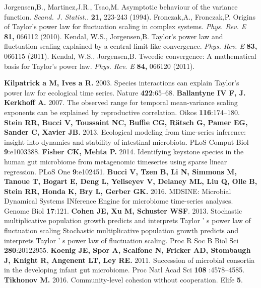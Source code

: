 \documentclass[12pt,oneside,letterpaper]{article}
\begin{document}
\begin{thebibliography}{99}
 Jorgensen,B., Martinez,J.R., Tsao,M. Asymptotic behaviour of the variance function. {\it Scand. J. Statist..} {\bf 21,} 223-243 (1994).
 Fronczak,A., Fronczak,P. Origins of Taylor's power law for fluctuation scaling in complex systems. {\it Phys. Rev. E} {\bf 81,} 066112 (2010).
 Kendal, W.S., Jorgensen,B. Taylor's power law and fluctuation scaling explained by a central-limit-like convergence. {\it Phys. Rev. E} {\bf 83,} 066115 (2011).
 Kendal, W.S., Jorgensen,B. Tweedie convergence: A mathematical basis for Taylor's power law. {\it Phys. Rev. E} {\bf 84,} 066120 (2011).

 {\bf Kilpatrick a M, Ives a R.} 2003. Species interactions can explain Taylor’s power law for ecological time series. Nature {\bf 422}:65–68.
 {\bf Ballantyne IV F, J. Kerkhoff A.} 2007. The observed range for temporal mean-variance scaling exponents can be explained by reproductive correlation. Oikos {\bf 116}:174–180.
 {\bf Stein RR, Bucci V, Toussaint NC, Buffie CG, Rätsch G, Pamer EG, Sander C, Xavier JB.}  2013. Ecological modeling from time-series inference: insight into dynamics and stability of intestinal microbiota. PLoS Comput Biol {\bf 9}:e1003388.
 {\bf Fisher CK, Mehta P.} 2014. Identifying keystone species in the human gut microbiome from metagenomic timeseries using sparse linear regression. PLoS One {\bf 9}:e102451.
  {\bf Bucci V, Tzen B, Li N, Simmons M, Tanoue T, Bogart E, Deng L, Yeliseyev V, Delaney ML, Liu Q, Olle B, Stein RR, Honda K, Bry L, Gerber GK.} 2016. MDSINE: Microbial Dynamical Systems INference Engine for microbiome time-series analyses. Genome Biol {\bf 17}:121.
 {\bf Cohen JE, Xu M, Schuster WSF}. 2013. Stochastic multiplicative population growth predicts and interprets Taylor ’ s power law of fluctuation scaling Stochastic multiplicative population growth predicts and interprets Taylor ’ s power law of fluctuation scaling. Proc R Soc B Biol Sci {\bf 280}:20122955.
 {\bf Koenig JE, Spor A, Scalfone N, Fricker AD, Stombaugh J, Knight R, Angenent LT, Ley RE.} 2011. Succession of microbial consortia in the developing infant gut microbiome. Proc Natl Acad Sci {\bf 108} :4578–4585.
 {\bf  Tikhonov M.} 2016. Community-level cohesion without cooperation. Elife {\bf 5}. 


\end{thebibliography}
\end{document}
